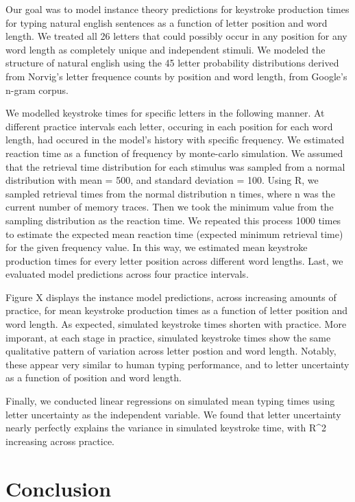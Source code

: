 \documentclass[floatsintext,man]{apa6}
\theoremstyle{definition}
\theoremstyle{definition}
\theoremstyle{definition}
\theoremstyle{remark}
\begin{document}
Our goal was to model instance theory predictions for keystroke
production times for typing natural english sentences as a function of
letter position and word length. We treated all 26 letters that could
possibly occur in any position for any word length as completely unique
and independent stimuli. We modeled the structure of natural english
using the 45 letter probability distributions derived from Norvig's
letter frequence counts by position and word length, from Google's
n-gram corpus.

We modelled keystroke times for specific letters in the following
manner. At different practice intervals each letter, occuring in each
position for each word length, had occured in the model's history with
specific frequency. We estimated reaction time as a function of
frequency by monte-carlo simulation. We assumed that the retrieval time
distribution for each stimulus was sampled from a normal distribution
with mean = 500, and standard deviation = 100. Using R, we sampled
retrieval times from the normal distribution n times, where n was the
current number of memory traces. Then we took the minimum value from the
sampling distribution as the reaction time. We repeated this process
1000 times to estimate the expected mean reaction time (expected minimum
retrieval time) for the given frequency value. In this way, we estimated
mean keystroke production times for every letter position across
different word lengths. Last, we evaluated model predictions across four
practice intervals.

Figure X displays the instance model predictions, across increasing
amounts of practice, for mean keystroke production times as a function
of letter position and word length. As expected, simulated keystroke
times shorten with practice. More imporant, at each stage in practice,
simulated keystroke times show the same qualitative pattern of variation
across letter postion and word length. Notably, these appear very
similar to human typing performance, and to letter uncertainty as a
function of position and word length.

Finally, we conducted linear regressions on simulated mean typing times
using letter uncertainty as the independent variable. We found that
letter uncertainty nearly perfectly explains the variance in simulated
keystroke time, with R\^{}2 increasing across practice.

\section{Conclusion}\label{conclusion}
\end{document}
